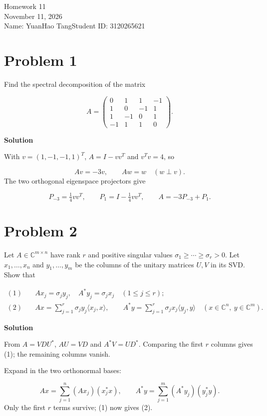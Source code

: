 \documentclass[UTF8,10pt,letterpaper,fontset=fandol]{ctexart}
\newcommand{\C}{\mathbb C}
\newcommand{\ip}[2]{\langle #1,#2\rangle}
\begin{document}
\begin{center}
{\LARGE Homework 11}\\[0.5em]
November 11, 2026\\[0.25em]
Name: YuanHao Tang\quad Student ID: 3120265621
\end{center}
\section{Problem 1}
Find the spectral decomposition of the matrix\par
\[A=\begin{pmatrix}0&1&1&-1\\1&0&-1&1\\1&-1&0&1\\-1&1&1&0\end{pmatrix}.\]
\par{}\textbf{Solution}\par
With $v=(1,-1,-1,1)^T$, $A=I-vv^T$ and $v^Tv=4$, so\par
\[Av=-3v,\qquad Aw=w\quad(w\perp v).\]
The two orthogonal eigenspace projectors give\par
\[P_{-3}=\tfrac14 vv^T,\qquad P_1=I-\tfrac14 vv^T,\qquad
\boxed{A=-3P_{-3}+P_1}.\]

\section{Problem 2}
Let $A\in\C^{m\times n}$ have rank $r$ and positive singular values $\sigma_1\ge\cdots\ge\sigma_r>0$. Let $x_1,\ldots,x_n$ and $y_1,\ldots,y_m$ be the columns of the unitary matrices $U,V$ in its SVD. Show that\par
\begin{align*}
(1)\quad &Ax_j=\sigma_j y_j,\quad A^*y_j=\sigma_jx_j\quad(1\le j\le r);\\
(2)\quad &Ax=\sum_{j=1}^r\sigma_j y_j\ip{x_j}{x},\qquad
 A^*y=\sum_{j=1}^r\sigma_j x_j\ip{y_j}{y}
 \quad(x\in\C^n,\ y\in\C^m).
\end{align*}
\par{}\textbf{Solution}\par
From $A=VDU^*$, $AU=VD$ and $A^*V=UD^*$. Comparing the first $r$ columns gives (1); the remaining columns vanish.\par
Expand in the two orthonormal bases:\par
\[
 Ax=\sum_{j=1}^n (Ax_j)(x_j^*x),\qquad
 A^*y=\sum_{j=1}^m(A^*y_j)(y_j^*y).
\]
Only the first $r$ terms survive; (1) now gives (2).\par
\newpage
\end{document}
